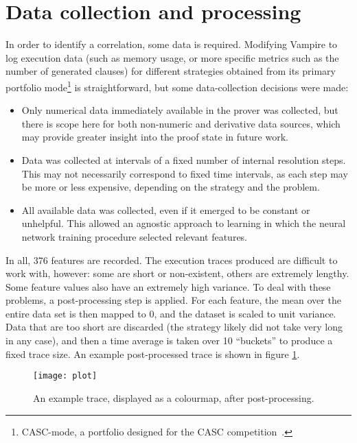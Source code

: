 \documentclass{scrartcl}
\begin{document}
\section{Data collection and processing}
In order to identify a correlation, some data is required.
Modifying Vampire to log execution data (such as memory usage, or more specific metrics such as the number of generated clauses) for different strategies obtained from its primary portfolio mode\footnote{CASC-mode, a portfolio designed for the CASC competition~\cite{CASC}.} is straightforward, but some data-collection decisions were made:
\begin{itemize}
	\item Only numerical data immediately available in the prover was collected, but there is scope here for both non-numeric and derivative data sources, which may provide greater insight into the proof state in future work.
	\item Data was collected at intervals of a fixed number of internal resolution steps. This may not necessarily correspond to fixed time intervals, as each step may be more or less expensive, depending on the strategy and the problem.
	\item All available data was collected, even if it emerged to be constant or unhelpful. This allowed an agnostic approach to learning in which the neural network training procedure selected relevant features.
\end{itemize}
In all, 376 features are recorded.
The execution traces produced are difficult to work with, however: some are short or non-existent, others are extremely lengthy.
Some feature values also have an extremely high variance.
To deal with these problems, a post-processing step is applied.
For each feature, the mean over the entire data set is then mapped to 0, and the dataset is scaled to unit variance.
Data that are too short are discarded (the strategy likely did not take very long in any case), and then a time average is taken over 10 ``buckets'' to produce a fixed trace size.
An example post-processed trace is shown in figure \ref{fig:trace}.

\begin{figure}
	\texttt{[image: plot]}
	\caption{An example trace, displayed as a colourmap, after post-processing.}
	\label{fig:trace}
\end{figure}
\end{document}
